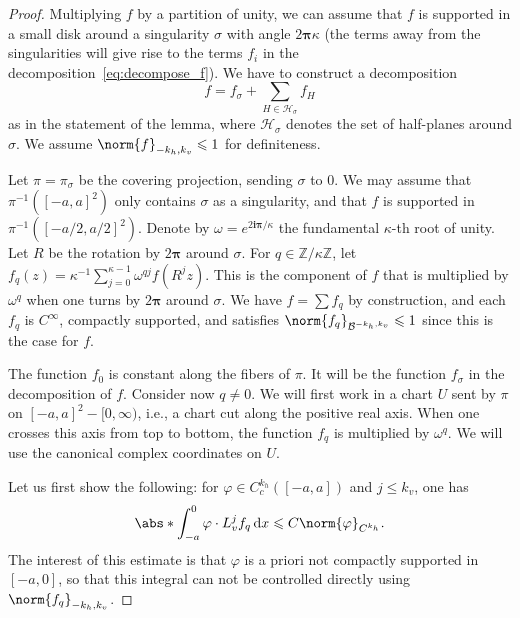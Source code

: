 \documentclass[11pt, a4paper, oneside, final, pagebackref]{amsart}
\newcommand{\boH}{\mathcal{H}}
\newcommand{\boB}{\mathcal{B}}
\newcommand{\Z}{\mathbb{Z}}
\newcommand{\dd}{\mathop{}\!\mathrm{d}}
\newcommand{\ic}{\mathbf{i}}
\newcommand{\bpi}{\boldsymbol{\pi}}
\renewcommand{\phi}{\varphi}
\renewcommand{\leq}{\leqslant}
\theoremstyle{definition}
\numberwithin{equation}{section}
\begin{document}
\begin{proof}
Multiplying $f$ by a partition of unity, we can assume that $f$ is supported
in a small disk around a singularity $\sigma$ with angle $2\bpi\kappa$ (the
terms away from the singularities will give rise to the terms $f_i$ in the
decomposition~\eqref{eq:decompose_f}). We have to construct a decomposition
\begin{equation}
\label{eq:wpuxcvopiuwxopicv}
  f = f_\sigma + \sum_{H\in \boH_\sigma} f_H
\end{equation}
as in the statement of the lemma, where $\boH_\sigma$ denotes the set of
half-planes around $\sigma$. We assume $\norm{f}_{-k_h, k_v}\leq 1$ for
definiteness.

Let $\pi=\pi_\sigma$ be the covering projection, sending $\sigma$ to $0$. We
may assume that $\pi^{-1}([-a,a]^2)$ only contains $\sigma$ as a singularity,
and that $f$ is supported in $\pi^{-1}([-a/2, a/2]^2)$. Denote by $\omega =
e^{2\ic\bpi/\kappa}$ the fundamental $\kappa$-th root of unity. Let $R$ be
the rotation by $2\bpi$ around $\sigma$. For $q \in \Z/\kappa \Z$, let
$f_q(z) = \kappa^{-1} \sum_{j=0}^{\kappa-1} \omega^{qj} f(R^j z)$. This is
the component of $f$ that is multiplied by $\omega^q$ when one turns by
$2\bpi$ around $\sigma$. We have $f = \sum f_q$ by construction, and each
$f_q$ is $C^\infty$, compactly supported, and satisfies
$\norm{f_q}_{\boB^{-k_h, k_v}} \leq 1$ since this is the case for $f$.

The function $f_0$ is constant along the fibers of $\pi$. It will be the
function $f_\sigma$ in the decomposition of $f$. Consider now $q\neq 0$. We
will first work in a chart $U$ sent by $\pi$ on $[-a,a]^2 -[0, \infty)$,
i.e., a chart cut along the positive real axis. When one crosses this axis
from top to bottom, the function $f_q$ is multiplied by $\omega^q$. We will
use the canonical complex coordinates on $U$.

Let us first show the following: for $\phi \in C_c^{k_h}([-a,a])$ and $j \leq
k_v$, one has
\begin{equation}
\label{eq:f_q_restr}
  \abs*{\int_{-a}^0 \phi \cdot L_v^j f_q \dd x} \leq C \norm{\phi}_{C^{k_h}}.
\end{equation}
The interest of this estimate is that $\phi$ is a priori not compactly
supported in $[-a, 0]$, so that this integral can not be controlled directly
using $\norm{f_q}_{-k_h, k_v}$.


\end{proof}
\end{document}
